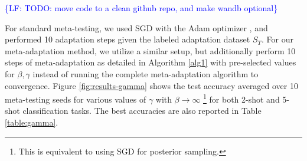 \documentclass{article}
\theoremstyle{definition}
\newcommand{\LF}[1]{\textcolor{blue}{\{LF: #1\}}}
\begin{document}
\LF{TODO: move code to a clean github repo, and make wandb optional}

For standard meta-testing, we used SGD with the Adam optimizer \citep{Kingma2015}, and performed 10 adaptation steps given the labeled adaptation dataset $S_T$. For our meta-adaptation method, we utilize a similar setup, but additionally perform 10 steps of meta-adaptation as detailed in Algorithm \ref{alg1} with pre-selected values for $\beta,\gamma$ instead of running the complete meta-adaptation algorithm to convergence. Figure \ref{fig:results-gamma} shows the test accuracy averaged over 10 meta-testing seeds for various values of $\gamma$ with $\beta\rightarrow \infty$ \footnote{This is equivalent to using SGD for posterior sampling.} for both 2-shot and 5-shot classification tasks. The best accuracies are also reported in Table \ref{table:gamma}.

\end{document}
